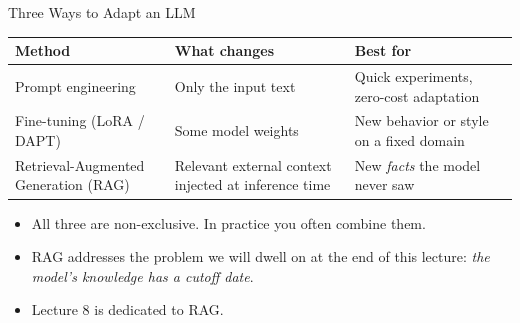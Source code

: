 \documentclass[10pt,english,aspectratio=169]{beamer}
\begin{document}
\begin{frame}{Three Ways to Adapt an LLM}
\begin{center}
\renewcommand{\arraystretch}{1.35}
\begin{tabular}{p{3.2cm} p{4.2cm} p{4.5cm}}
\toprule
\textbf{Method} & \textbf{What changes} & \textbf{Best for} \\
\midrule
Prompt engineering & Only the input text & Quick experiments, zero-cost adaptation \\
Fine-tuning (LoRA / DAPT) & Some model weights & New behavior or style on a fixed domain \\
Retrieval-Augmented Generation (RAG) & Relevant external context injected at inference time & New \emph{facts} the model never saw \\
\bottomrule
\end{tabular}
\end{center}

\medskip
\begin{itemize}
\item All three are non-exclusive. In practice you often combine them.
\item RAG addresses the problem we will dwell on at the end of this lecture: \emph{the model's knowledge has a cutoff date}.
\item Lecture 8 is dedicated to RAG.
\end{itemize}
\end{frame}
\end{document}
